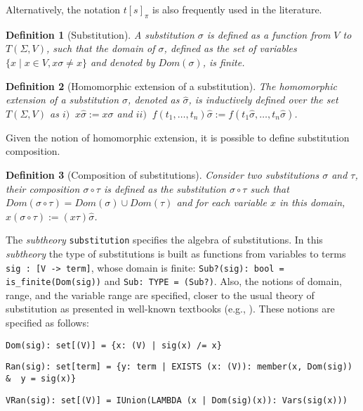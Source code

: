 \documentclass[submission,copyright,creativecommons]{eptcs}
\newtheorem{definition}{Definition}
\begin{document}
Alternatively, the notation $t[s]_\pi$ is also frequently used in the
literature.

\begin{definition}[Substitution]
  A substitution $\sigma$ is defined as a function from $V$ to
  $T(\Sigma, V)$, such that the domain of $\sigma$, defined as the set
  of variables $\{x \;|\; x\in V, x\sigma\not= x\}$ and denoted by
  $Dom(\sigma)$, is finite.
\end{definition}

\begin{definition}[Homomorphic extension of a substitution]
  The homomorphic extension of a substitution $\sigma$, denoted as
  $\hat{\sigma}$, is inductively defined over the set $T(\Sigma, V)$
  as $i)\;\; x\hat{\sigma}:= x\sigma$ and $ii)\;\;
  f(t_1,\ldots,t_n)\hat{\sigma}:=
  f(t_1\hat{\sigma},\ldots,t_n\hat{\sigma})$.
\end{definition}

Given the notion of homomorphic extension, it is possible to define
substitution composition.

\begin{definition}[Composition of substitutions]
  Consider two substitutions $\sigma$ and $\tau$, their composition
  $\sigma\circ \tau$ is defined as the substitution $\sigma\circ\tau$
  such that $Dom(\sigma\circ\tau) = Dom(\sigma) \cup Dom(\tau)$ and
  for each variable $x$ in this domain, $x(\sigma\circ\tau) :=
  (x\tau)\hat{\sigma}$.
\end{definition}

The \emph{subtheory} {\tt substitution} specifies the algebra of
substitutions. In this \emph{subtheory} the type of substitutions is
built as functions from variables to terms {\tt sig : [V -> term]},
whose domain is finite: {\tt Sub?(sig): bool = is\_finite(Dom(sig))}
and {\tt Sub: TYPE = (Sub?)}. Also, the notions of domain, range, and
the variable range are specified, closer to the usual theory of
substitution as presented in well-known textbooks (e.g.,
\cite{BaNi98}).  These notions are specified as follows:

{\small
\begin{verbatim}
Dom(sig): set[(V)] = {x: (V) | sig(x) /= x}
\end{verbatim}
} {\small
\begin{verbatim}
Ran(sig): set[term] = {y: term | EXISTS (x: (V)): member(x, Dom(sig)) &  y = sig(x)}
\end{verbatim}
} {\small
\begin{verbatim}
VRan(sig): set[(V)] = IUnion(LAMBDA (x | Dom(sig)(x)): Vars(sig(x)))
\end{verbatim}
}
\end{document}
